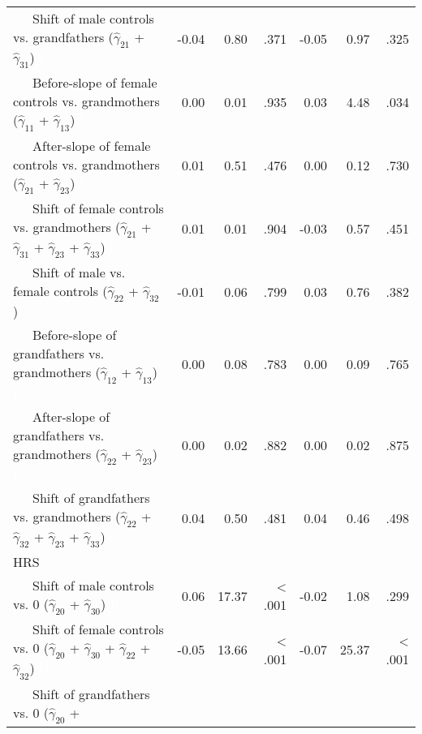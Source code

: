 \documentclass[
  english,
  man, noextraspace]{apa7}
\newenvironment{lltable}{\begin{landscape}\begin{center}\begin{ThreePartTable}}{\end{ThreePartTable}\end{center}\end{landscape}}
\begin{document}
\begin{lltable}
{\begin{longtable}{lrrrrrr}
\ \ \ Shift of male controls vs. grandfathers 
                              ($\hat{\gamma}_{21}$ + $\hat{\gamma}_{31}$) \textcolor{white}{L} & -0.04 & 0.80 & .371 & -0.05 & 0.97 & .325\\
\ \ \ Before-slope of female controls vs. grandmothers 
                              ($\hat{\gamma}_{11}$ + $\hat{\gamma}_{13}$) \textcolor{white}{L} & 0.00 & 0.01 & .935 & 0.03 & 4.48 & .034\\
\ \ \ After-slope of female controls vs. grandmothers 
                              ($\hat{\gamma}_{21}$ + $\hat{\gamma}_{23}$) \textcolor{white}{L} & 0.01 & 0.51 & .476 & 0.00 & 0.12 & .730\\
\ \ \ Shift of female controls vs. grandmothers 
                              ($\hat{\gamma}_{21}$ + $\hat{\gamma}_{31}$ + 
                              $\hat{\gamma}_{23}$ + $\hat{\gamma}_{33}$) \textcolor{white}{L} & 0.01 & 0.01 & .904 & -0.03 & 0.57 & .451\\
\ \ \ Shift of male vs. female controls 
                              ($\hat{\gamma}_{22}$ + $\hat{\gamma}_{32}$) \textcolor{white}{L} & -0.01 & 0.06 & .799 & 0.03 & 0.76 & .382\\
\ \ \ Before-slope of grandfathers vs. grandmothers 
                              ($\hat{\gamma}_{12}$ + $\hat{\gamma}_{13}$) \textcolor{white}{L} & 0.00 & 0.08 & .783 & 0.00 & 0.09 & .765\\
\ \ \ After-slope of grandfathers vs. grandmothers 
                              ($\hat{\gamma}_{22}$ + $\hat{\gamma}_{23}$) \textcolor{white}{L} & 0.00 & 0.02 & .882 & 0.00 & 0.02 & .875\\
\ \ \ Shift of grandfathers vs. grandmothers 
                              ($\hat{\gamma}_{22}$ + $\hat{\gamma}_{32}$ + 
                              $\hat{\gamma}_{23}$ + $\hat{\gamma}_{33}$) \textcolor{white}{L} & 0.04 & 0.50 & .481 & 0.04 & 0.46 & .498\\
HRS &  &  &  &  &  & \\
\ \ \ Shift of male controls vs. 0 ($\hat{\gamma}_{20}$ + 
                              $\hat{\gamma}_{30}$) \textcolor{white}{H} & 0.06 & 17.37 & < .001 & -0.02 & 1.08 & .299\\
\ \ \ Shift of female controls vs. 0 ($\hat{\gamma}_{20}$ + 
                              $\hat{\gamma}_{30}$ + $\hat{\gamma}_{22}$ + 
                              $\hat{\gamma}_{32}$) \textcolor{white}{H} & -0.05 & 13.66 & < .001 & -0.07 & 25.37 & < .001\\
\ \ \ Shift of grandfathers vs. 0 ($\hat{\gamma}_{20}$ + 

\end{longtable}}
\end{lltable}
\end{document}
